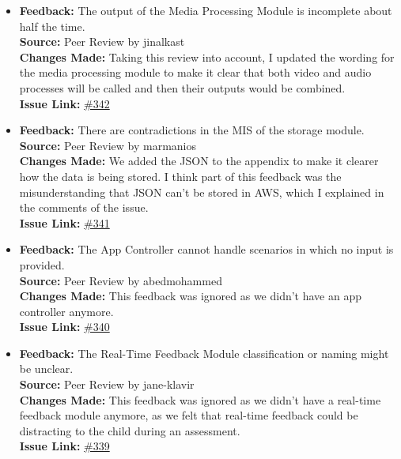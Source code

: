 \documentclass{article}
\begin{document}
\begin{itemize}
    \item 
        \textbf{Feedback:} The output of the Media Processing Module is incomplete about half the time.\\
        \textbf{Source:} Peer Review by jinalkast\\
        \textbf{Changes Made:} Taking this review into account, I updated the wording for the media processing module to make it clear that both video and audio processes will be called and then their outputs would be combined.\\
        \textbf{Issue Link:} \href{https://github.com/parishanizam/TeleHealth/issues/342}{\#342}
    
    \item 
        \textbf{Feedback:} There are contradictions in the MIS of the storage module.\\
        \textbf{Source:} Peer Review by marmanios\\
        \textbf{Changes Made:} We added the JSON to the appendix to make it clearer how the data is being stored. I think part of this feedback was the misunderstanding that JSON can’t be stored in AWS, which I explained in the comments of the issue.\\
        \textbf{Issue Link:} \href{https://github.com/parishanizam/TeleHealth/issues/341}{\#341}
    
    \item 
        \textbf{Feedback:} The App Controller cannot handle scenarios in which no input is provided.\\
        \textbf{Source:} Peer Review by abedmohammed\\
        \textbf{Changes Made:} This feedback was ignored as we didn’t have an app controller anymore.\\
        \textbf{Issue Link:} \href{https://github.com/parishanizam/TeleHealth/issues/340}{\#340}
  
    \item 
        \textbf{Feedback:} The Real-Time Feedback Module classification or naming might be unclear.\\
        \textbf{Source:} Peer Review by jane-klavir\\
        \textbf{Changes Made:} This feedback was ignored as we didn’t have a real-time feedback module anymore, as we felt that real-time feedback could be distracting to the child during an assessment.\\
        \textbf{Issue Link:} \href{https://github.com/parishanizam/TeleHealth/issues/339}{\#339}
  

\end{itemize}
\end{document}

